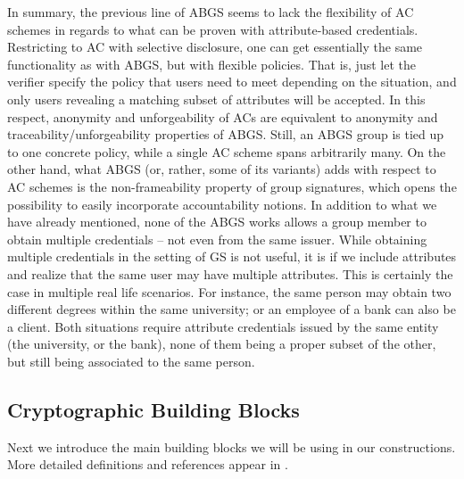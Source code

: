 In summary, the previous line of ABGS seems to lack the flexibility of AC
schemes in regards to what can be proven with attribute-based credentials.
Restricting to AC with selective disclosure, one can get essentially the same
functionality as with ABGS, but with flexible policies. That is, just let
the verifier specify the policy that users need to meet depending on the
situation, and only users revealing a matching subset of attributes will be
accepted. In this respect, anonymity and unforgeability of ACs are equivalent to
anonymity and traceability/unforgeability properties of ABGS. Still, an ABGS
group is tied up to one concrete policy, while a single AC scheme spans
arbitrarily many.
%
On the other hand, what ABGS (or, rather, some of its variants) adds with
respect to AC schemes is the non-frameability property of group signatures,
which opens the possibility to easily incorporate accountability notions.
%
In addition to what we have already mentioned, none of the ABGS works allows
a group member to obtain multiple credentials -- not even from the same issuer.
While obtaining multiple credentials in the setting of GS is not useful, it is
if we include attributes and realize that the same user may have multiple
attributes. This is certainly the case in multiple real life scenarios. For
instance, the same person may obtain two different degrees within the same
university; or an employee of a bank can also be a client. Both situations
require attribute credentials issued by the same entity (the university, or
the bank), none of them being a proper subset of the other, but still being
associated to the same person.

\fi

\subsection{Cryptographic Building Blocks}
\label{ssec:cryptobblocks}

Next we introduce the main building blocks we will be using in our
constructions. More detailed definitions and references appear in
.


